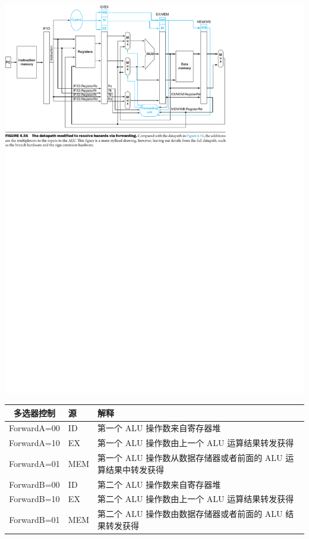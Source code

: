 \documentclass[a4paper,UTF8]{ctexart}
\begin{document}
\includegraphics[width=\textwidth]{forwarding.pdf}

\begin{table}[h]
    \centering
    \begin{tabular}{>{\ttfamily}c>{\ttfamily}ll}
        \toprule
        多选器控制 & 源 & 解释 \\
        \midrule
        ForwardA=00 & ID & 第一个 ALU 操作数来自寄存器堆 \\
        ForwardA=10 & EX & 第一个 ALU 操作数由上一个 ALU 运算结果转发获得 \\
        ForwardA=01 & MEM & 第一个 ALU 操作数从数据存储器或者前面的 ALU 运算结果中转发获得 \\
        ForwardB=00 & ID & 第二个 ALU 操作数来自寄存器堆 \\
        ForwardB=10 & EX & 第二个 ALU 操作数由上一个 ALU 运算结果转发获得 \\
        ForwardB=01 & MEM & 第二个 ALU 操作数由数据存储器或者前面的 ALU 结果转发获得 \\
        \bottomrule
    \end{tabular}
\end{table}
\end{document}
